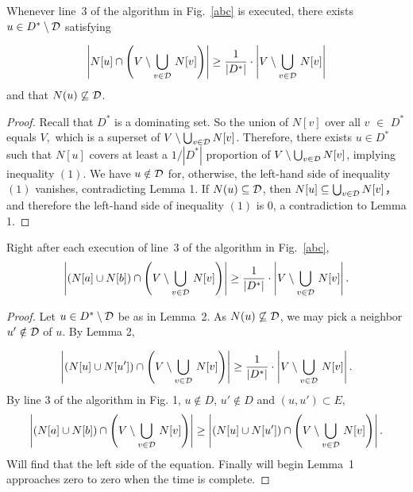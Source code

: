 \documentclass[12pt]{article}
\begin{document}
\begin{lemma}
Whenever line~3 of the algorithm in Fig.~\ref{abc} is executed,
there exists $u\in D^*\setminus {\cal D}$ satisfying

\begin{equation}
\left|N[u]\cap \left(V\setminus \bigcup_{v\in {\cal D}}\,N[v]\right)\right|
\ge \frac{1}{|D^*|}
\cdot\left|V\setminus \bigcup_{v\in {\cal D}}\,N[v]\right|
\label{lemma2-equation}
\end{equation}
and that $N(u)\not\subseteq {\cal D}$.
\end{lemma}

\begin{proof}
Recall that $D^*$ is a dominating set. So the union of $N[v]$ over all $v$ $\in$ $D^*$ equals $V, $ which is a superset of $V\setminus \bigcup_{v\in{\cal D}} N[v]$. Therefore, there exists $u\in D^*$ such that $N[u]$ covers at least a ${1}/{|D^*|}$ proportion of $V\setminus \bigcup_{v\in{\cal D}} N[v]$, implying inequality $(1)$. We have $u\notin {\cal D}$ for, otherwise, the left-hand side of inequality $(1)$ vanishes, contradicting Lemma 1.
If $N(u)\subseteq {\cal D}$,  then $N[u]\subseteq \bigcup_{v\in {\cal D}} N[v]$， and therefore the left-hand side of inequality $(1)$ is 0, a contradiction to Lemma 1.
\end{proof}



\clearpage

\begin{lemma}
Right after each execution of line~3 of the algorithm in Fig.~\ref{abc},
\begin{equation}
\left|\left(N[a]\cup N[b]\right)\cap \left(V\setminus \bigcup_{v\in {\cal D}}\,N[v]\right)\right|
\ge \frac{1}{|D^*|}
\cdot\left|V\setminus \bigcup_{v\in {\cal D}}\,N[v]\right|.
\end{equation}
\end{lemma}
\begin{proof}
Let $u\in D^*\setminus {\cal D}$ be as in Lemma~2. As $N(u)\not\subseteq {\cal D}$, we may pick a neighbor $u'\notin {\cal D}$ of $u$. By Lemma 2,

\begin{equation}
\left|\left(N[u]\cup N[u']\right)\cap \left(V\setminus \bigcup_{v\in {\cal D}}\,N[v]\right)\right|
\ge \frac{1}{|D^*|}
\cdot\left|V\setminus \bigcup_{v\in {\cal D}}\,N[v]\right|.
\end{equation}
By line 3 of the algorithm in Fig. 1, $u \notin D$, $u'\notin D$ and $(u,u')\subset E, $
\begin{equation}
\left|\left(N[a]\cup N[b]\right)\cap \left(V\setminus \bigcup_{v\in {\cal D}}\,N[v]\right)\right| \geq \left|\left(N[u]\cup N[u']\right)\cap \left(V\setminus \bigcup_{v\in {\cal D}}\,N[v]\right)\right|.
\end{equation}
Will find that the left side of the equation. Finally will begin Lemma~1 approaches zero to zero when the time is complete.
\end{proof}
\end{document}
